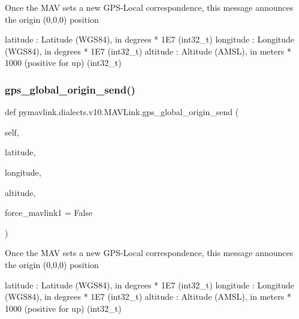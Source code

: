 \begin{DoxyVerb}
\begin{DoxyVerb}
\begin{DoxyVerb}Once the MAV sets a new GPS-Local correspondence, this message
announces the origin (0,0,0) position

latitude                  : Latitude (WGS84), in degrees * 1E7 (int32_t)
longitude                 : Longitude (WGS84), in degrees * 1E7 (int32_t)
altitude                  : Altitude (AMSL), in meters * 1000 (positive for up) (int32_t)\end{DoxyVerb}
 \mbox{\label{classpymavlink_1_1dialects_1_1v10_1_1MAVLink_a63102f06f0ba7d9d1b81d5716125019f}} 
\subsubsection{\texorpdfstring{gps\+\_\+global\+\_\+origin\+\_\+send()}{gps\_global\_origin\_send()}}
{\footnotesize\ttfamily def pymavlink.\+dialects.\+v10.\+M\+A\+V\+Link.\+gps\+\_\+global\+\_\+origin\+\_\+send (\begin{DoxyParamCaption}\item[{}]{self,  }\item[{}]{latitude,  }\item[{}]{longitude,  }\item[{}]{altitude,  }\item[{}]{force\+\_\+mavlink1 = {\ttfamily False} }\end{DoxyParamCaption})}

\begin{DoxyVerb}Once the MAV sets a new GPS-Local correspondence, this message
announces the origin (0,0,0) position

latitude                  : Latitude (WGS84), in degrees * 1E7 (int32_t)
longitude                 : Longitude (WGS84), in degrees * 1E7 (int32_t)
altitude                  : Altitude (AMSL), in meters * 1000 (positive for up) (int32_t)\end{DoxyVerb}
 \mbox{\label{classpymavlink_1_1dialects_1_1v10_1_1MAVLink_a01573fb71a7ef4636652f95a3a255eea}} 

\end{DoxyVerb}
\end{DoxyVerb}
